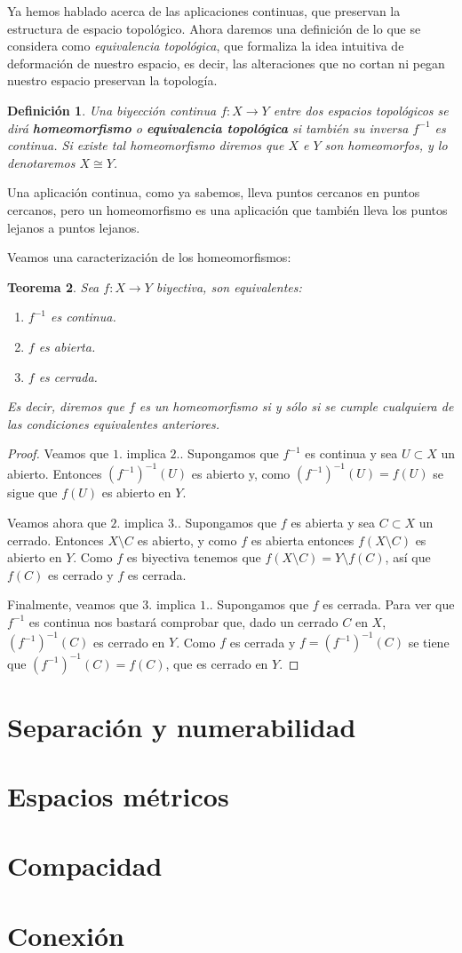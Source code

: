 \documentclass[12pt]{article}
\newtheorem{theorem}{Teorema}[section]
\newtheorem{definition}[theorem]{Definición}
\begin{document}
Ya hemos hablado acerca de las aplicaciones continuas, que preservan la estructura de espacio topológico. Ahora daremos una definición de lo que se considera como \textit{equivalencia topológica}, que formaliza la idea intuitiva de deformación de nuestro espacio, es decir, las alteraciones que no cortan ni pegan nuestro espacio preservan la topología.

\begin{definition}Una biyección continua $f \colon X \longrightarrow Y$ entre dos espacios topológicos se dirá \textbf{homeomorfismo} o \textbf{equivalencia topológica} si también su inversa $f^{-1}$ es continua. Si existe tal homeomorfismo diremos que $X$ e $Y$ son homeomorfos, y lo denotaremos $X \cong Y$.
\end{definition}

Una aplicación continua, como ya sabemos, lleva puntos cercanos en puntos cercanos, pero un homeomorfismo es una aplicación que también lleva los puntos lejanos a puntos lejanos.

Veamos una caracterización de los homeomorfismos:

\begin{theorem}
Sea $f \colon X \longrightarrow Y$ biyectiva, son equivalentes: 
\begin{enumerate}
\item $f^{-1}$ es continua.
\item $f$ es abierta.
\item $f$ es cerrada.
\end{enumerate}

Es decir, diremos que $f$ es un homeomorfismo si y sólo si se cumple cualquiera de las condiciones equivalentes anteriores.
\end{theorem}
\begin{proof}
Veamos que $1.$ implica $2.$. Supongamos que $f^{-1}$ es continua y sea $U \subset X$ un abierto. Entonces $(f^{-1})^{-1}(U)$ es abierto y, como $(f^{-1})^{-1}(U) = f(U)$ se sigue que $f(U)$ es abierto en $Y$.

Veamos ahora que $2.$ implica $3.$. Supongamos que $f$ es abierta y sea $C \subset X$ un cerrado. Entonces $X \setminus C$ es abierto, y como $f$ es abierta entonces $f(X \setminus C)$ es abierto en $Y$. Como $f$ es biyectiva tenemos que $f(X \setminus C) = Y \setminus f(C)$, así que $f(C)$ es cerrado y $f$ es cerrada.

Finalmente, veamos que $3.$ implica $1.$. Supongamos que $f$ es cerrada. Para ver que $f^{-1}$ es continua nos bastará comprobar que, dado un cerrado $C$ en $X$, $(f^{-1})^{-1}(C)$ es cerrado en $Y$. Como $f$ es cerrada y $f=(f^{-1})^{-1}(C)$ se tiene que $(f^{-1})^{-1}(C) = f(C)$, que es cerrado en $Y$.

\end{proof}

\section{Separación y numerabilidad}
\section{Espacios métricos}
\section{Compacidad}
\section{Conexión}
\end{document}
